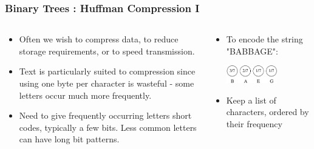 
\begin{frame}[fragile]
\frametitle{Binary Trees : Huffman Compression I}
\begin{columns}[T]

\begin{column}{0.45\textwidth}
\begin{itemize}[<+->]
\item Often we wish to compress data, to reduce storage requirements, or to speed transmission.
\item  Text is particularly suited to compression since using one byte per character is wasteful - some letters occur much more frequently.
\item  Need to give frequently occurring letters short codes, typically a few bits. Less common letters can have long bit patterns.
\end{itemize}
\end{column}

\begin{column}{0.45\textwidth}
\begin{itemize}[<+->]
\item To encode the string "BABBAGE":

\vspace*{2ex}
\pause
\begin{center}
\includegraphics[width=0.6\textwidth]{../Images/huff1.pdf}
\end{center}
\item Keep a list of characters, ordered by their frequency
\end{itemize}
\end{column}

\end{columns}
\end{frame}


